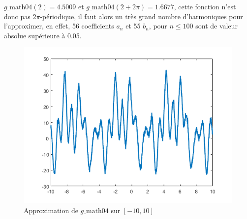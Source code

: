 \documentclass{article}
\begin{document}
$g\_\text{math04}(2) = 4.5009$ et $g\_\text{math04}(2 + 2\pi) = 1.6677$, cette fonction n'est donc pas 
$2\pi$-périodique, il faut alors un très grand nombre d'harmoniques pour l'approximer,
en effet, 56 coefficients $a_n$ et 55 $b_n$, pour $n \leq 100$ sont de valeur absolue supérieure à 0.05.
\begin{figure}[ht!]
    \centering
    \includegraphics[height=0.3\textwidth]{figures/approx_g.png}
    \caption{Approximation de  $g\_\text{math04}$ sur $[-10, 10]$}
\end{figure}
\end{document}

